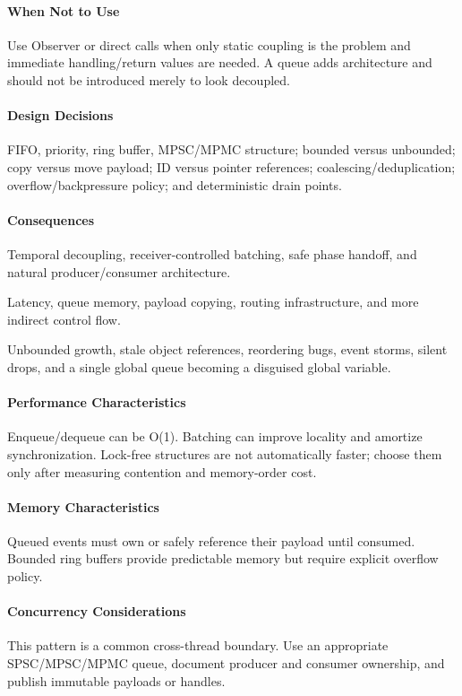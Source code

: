 \documentclass[11pt]{article}
\begin{document}
\paragraph{When Not to Use} Use Observer or direct calls when only static coupling is the problem and immediate handling/return values are needed. A queue adds architecture and should not be introduced merely to look decoupled.
\paragraph{Design Decisions} FIFO, priority, ring buffer, MPSC/MPMC structure; bounded versus unbounded; copy versus move payload; ID versus pointer references; coalescing/deduplication; overflow/backpressure policy; and deterministic drain points.
\paragraph{Consequences}
\begin{description}[leftmargin=2.7cm,style=nextline]
\item[Benefits] Temporal decoupling, receiver-controlled batching, safe phase handoff, and natural producer/consumer architecture.
\item[Costs] Latency, queue memory, payload copying, routing infrastructure, and more indirect control flow.
\item[Risks] Unbounded growth, stale object references, reordering bugs, event storms, silent drops, and a single global queue becoming a disguised global variable.
\end{description}
\paragraph{Performance Characteristics} Enqueue/dequeue can be O(1). Batching can improve locality and amortize synchronization. Lock-free structures are not automatically faster; choose them only after measuring contention and memory-order cost.
\paragraph{Memory Characteristics} Queued events must own or safely reference their payload until consumed. Bounded ring buffers provide predictable memory but require explicit overflow policy.
\paragraph{Concurrency Considerations} This pattern is a common cross-thread boundary. Use an appropriate SPSC/MPSC/MPMC queue, document producer and consumer ownership, and publish immutable payloads or handles.
\end{document}
